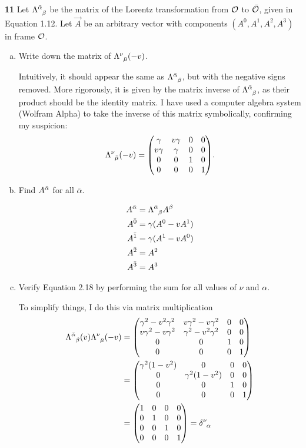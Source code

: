 \documentclass[gr-notes.tex]{subfiles}
\begin{document}
\textbf{11}
Let $\tensor{\Lambda}{^{\bar\alpha}_\beta}$ be the matrix of the Lorentz transformation from $\mathcal{O}$ to $\bar{\mathcal{O}}$, given in Equation 1.12. Let $\vec{A}$ be an arbitrary vector with components $(A^0, A^1, A^2, A^3)$ in frame $\mathcal{O}$.
%
\begin{enumerate}[(a)]
\item Write down the matrix of $\tensor{\Lambda}{^\nu_{\bar\mu}}(-v)$.

Intuitively, it should appear the same as $\tensor{\Lambda}{^{\bar\alpha}_\beta}$, but with the negative signs removed. More rigorously, it is given by the matrix inverse of $\tensor{\Lambda}{^{\bar\alpha}_\beta}$, as their product should be the identity matrix. I have used a computer algebra system (Wolfram Alpha) to take the inverse of this matrix symbolically, confirming my suspicion:
%
\begin{displaymath}
  \tensor{\Lambda}{^\nu_{\bar\mu}}(-v) =
  \mqty(
    \gamma  & v\gamma & 0 & 0
    \\
    v\gamma & \gamma  & 0 & 0
    \\
    0       & 0       & 1 & 0
    \\
    0       & 0       & 0 & 1
  ).
\end{displaymath}

\item Find $\tensor{A}{^{\bar\alpha}}$ for all $\bar\alpha$.

\begin{align*}
  \tensor{A}{^{\bar\alpha}} &=
  \tensor{\Lambda}{^{\bar\alpha}_\beta} \tensor{A}{^\beta}
  \\
  \tensor{A}{^{\bar0}} &= \gamma (\tensor{A}{^0} - v \tensor{A}{^1})
  \\
  \tensor{A}{^{\bar1}} &= \gamma (\tensor{A}{^1} - v \tensor{A}{^0})
  \\
  \tensor{A}{^{\bar2}} &= \tensor{A}{^2}
  \\
  \tensor{A}{^{\bar3}} &= \tensor{A}{^3}
\end{align*}

\item Verify Equation 2.18 by performing the sum for all values of $\nu$ and $\alpha$.

To simplify things, I do this via matrix multiplication
%
\begin{align*}
  \tensor{\Lambda}{^{\bar\alpha}_\beta}(v)
  \tensor{\Lambda}{^\nu_{\bar\mu}}(-v) &=
  \mqty(
    \gamma^2 - v^2 \gamma^2 & v \gamma^2 - v \gamma^2 & 0 & 0
    \\
    v \gamma^2 - v \gamma^2 & \gamma^2 - v^2 \gamma^2 & 0 & 0
    \\
    0 & 0 & 1 & 0
    \\
    0 & 0 & 0 & 1
  )
  \\ &=
  \mqty(
    \gamma^2 (1 - v^2) & 0 & 0 & 0
    \\
    0 & \gamma^2 (1 - v^2) & 0 & 0
    \\
    0 & 0 & 1 & 0
    \\
    0 & 0 & 0 & 1
  )
  \\ &=
  \mqty(\imat{4}) =
  \tensor{\delta}{^\nu_\alpha}
\end{align*}


\end{enumerate}
\end{document}
